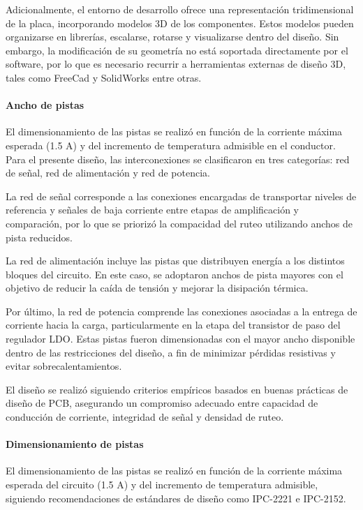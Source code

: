 \documentclass[]{article}
\begin{document}
	Adicionalmente, el entorno de desarrollo ofrece una representación tridimensional de la placa, incorporando modelos 3D de los componentes. Estos modelos pueden organizarse en librerías, escalarse, rotarse y visualizarse dentro del diseño. Sin embargo, la modificación de su geometría no está soportada directamente por el software, por lo que es necesario recurrir a herramientas externas de diseño 3D, tales como FreeCad y SolidWorks entre otras.
	
	\paragraph{Ancho de pistas}
	
	
	El dimensionamiento de las pistas se realizó en función de la corriente máxima esperada (1.5 A) y del incremento de temperatura admisible en el conductor. Para el presente diseño, las interconexiones se clasificaron en tres categorías: red de señal, red de alimentación y red de potencia.
	
	La red de señal corresponde a las conexiones encargadas de transportar niveles de referencia y señales de baja corriente entre etapas de amplificación y comparación, por lo que se priorizó la compacidad del ruteo utilizando anchos de pista reducidos.
	
	La red de alimentación incluye las pistas que distribuyen energía a los distintos bloques del circuito. En este caso, se adoptaron anchos de pista mayores con el objetivo de reducir la caída de tensión y mejorar la disipación térmica.
	
	Por último, la red de potencia comprende las conexiones asociadas a la entrega de corriente hacia la carga, particularmente en la etapa del transistor de paso del regulador LDO. Estas pistas fueron dimensionadas con el mayor ancho disponible dentro de las restricciones del diseño, a fin de minimizar pérdidas resistivas y evitar sobrecalentamientos.
	
	El diseño se realizó siguiendo criterios empíricos basados en buenas prácticas de diseño de PCB, asegurando un compromiso adecuado entre capacidad de conducción de corriente, integridad de señal y densidad de ruteo.
	
	
	\paragraph{Dimensionamiento de pistas}
	
	El dimensionamiento de las pistas se realizó en función de la corriente máxima esperada del circuito (1.5 A) y del incremento de temperatura admisible, siguiendo recomendaciones de estándares de diseño como IPC-2221 e IPC-2152.
	
\end{document}
